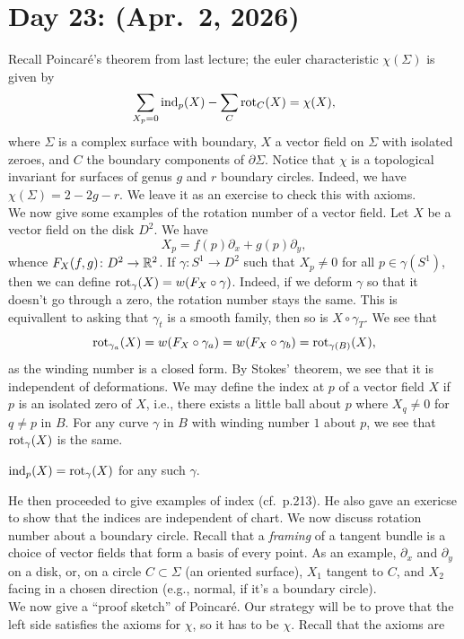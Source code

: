 \section{Day 23: (Apr.\ 2, 2026)}
Recall Poincar\'e's theorem from last lecture; the euler characteristic $\chi(\Sigma)$ is given by
\[ \sum_{X_p = 0} \operatorname{ind}_p(X) - \sum_{C} \operatorname{rot}_C(X) = \chi(X), \]
where $\Sigma$ is a complex surface with boundary, $X$ a vector field on $\Sigma$ with isolated zeroes, and $C$ the boundary components of $\partial \Sigma$. Notice that $\chi$ is a topological invariant for surfaces of genus $g$ and $r$ boundary circles. Indeed, we have $\chi(\Sigma) = 2 - 2g - r$. We leave it as an exercise to check this with axioms.
\\[8pt]
We now give some examples of the rotation number of a vector field. Let $X$ be a vector field on the disk $D^2$. We have
\[ X_p = f(p) \partial_x + g(p) \partial_y, \]
whence $F_X(f, g) \colon D^2 \to \mathbb R^2$. If $\gamma \colon S^1 \to D^2$ such that $X_p \neq 0$ for all $p \in \gamma(S^1)$, then we can define $\operatorname{rot}_\gamma(X) = w(F_X \circ \gamma)$. Indeed, if we deform $\gamma$ so that it doesn't go through a zero, the rotation number stays the same. This is equivallent to asking that $\gamma_t$ is a smooth family, then so is $X \circ \gamma_T$. We see that
\[ \operatorname{rot}_{\gamma_a}(X) = w(F_X \circ \gamma_a) = w(F_X \circ \gamma_b) = \operatorname{rot}_{\gamma(B)}(X), \]
as the winding number is a closed form. By Stokes' theorem, we see that it is independent of deformations. We may define the index at $p$ of a vector field $X$ if $p$ is an isolated zero of $X$, i.e., there exists a little ball about $p$ where $X_q \neq 0$ for $q \neq p$ in $B$. For any curve $\gamma$ in $B$ with winding number $1$ about $p$, we see that $\operatorname{rot}_\gamma(X)$ is the same.
\begin{definition}
    $\operatorname{ind}_p(X) = \operatorname{rot}_{\gamma}(X)$ for any such $\gamma$.
\end{definition}
He then proceeded to give examples of index (cf.\ p.213). He also gave an exericse to show that the indices are independent of chart. We now discuss rotation number about a boundary circle. Recall that a \textit{framing} of a tangent bundle is a choice of vector fields that form a basis of every point. As an example, $\partial_x$ and $\partial_y$ on a disk, or, on a circle $C \subset \Sigma$ (an oriented surface), $X_1$ tangent to $C$, and $X_2$ facing in a chosen direction (e.g., normal, if it's a boundary circle).
\\[8pt]
We now give a ``proof sketch'' of Poincar\'e. Our strategy will be to prove that the left side satisfies the axioms for $\chi$, so it has to be $\chi$. Recall that the axioms are

